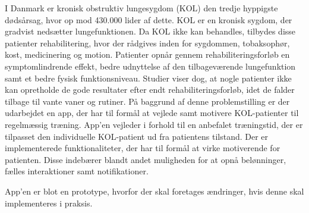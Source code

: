 I Danmark er kronisk obstruktiv lungesygdom (KOL) den tredje hyppigste dødsårsag, hvor op mod 430.000 lider af dette. KOL er en kronisk sygdom, der gradvist nedsætter lungefunktionen. Da KOL ikke kan behandles, tilbydes disse patienter rehabilitering, hvor der rådgives inden for sygdommen, tobaksophør, kost, medicinering og motion. Patienter opnår gennem rehabiliteringsforløb en symptomlindrende effekt, bedre udnyttelse af den tilbageværende lungefunktion samt et bedre fysisk funktionsniveau. Studier viser dog, at nogle patienter ikke kan opretholde de gode resultater efter endt rehabiliteringsforløb, idet de falder tilbage til vante vaner og rutiner. På baggrund af denne problemstilling er der udarbejdet en app, der har til formål at vejlede samt motivere KOL-patienter til regelmæssig træning. App’en vejleder i forhold til en anbefalet træningstid, der er tilpasset den individuelle KOL-patient ud fra patientens tilstand. Der er implementerede funktionaliteter, der har til formål at virke motiverende for patienten. Disse indebærer blandt andet muligheden for at opnå belønninger, fælles interaktioner samt notifikationer. 
 
App’en er blot en prototype, hvorfor der skal foretages ændringer, hvis denne skal implementeres i praksis. 

